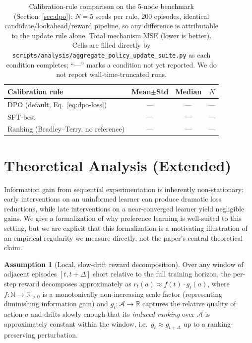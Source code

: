 \documentclass[twoside]{article}
\theoremstyle{plain}
\theoremstyle{definition}
\newtheorem{assumption}[theorem]{Assumption}
\theoremstyle{remark}
\begin{document}
\begin{table}[h]
\centering
\caption{Calibration-rule comparison on the 5-node benchmark (Section~\ref{sec:dpo}): $N{=}5$ seeds per rule, 200 episodes, identical candidate/lookahead/reward pipeline, so any difference is attributable to the update rule alone. Total mechanism MSE (lower is better). Cells are filled directly by \texttt{scripts/analysis/aggregate\_policy\_update\_suite.py} as each condition completes; ``---'' marks a condition not yet reported. We do not report wall-time-truncated runs.}
\label{tab:calibration-rules}
\small
\begin{tabular}{@{}lccc@{}}
\toprule
Calibration rule & Mean$\pm$Std & Median & $N$ \\
\midrule
DPO (default, Eq.~\ref{eq:dpo-loss}) & --- & --- & --- \\
SFT-best & --- & --- & --- \\
Ranking (Bradley--Terry, no reference) & --- & --- & --- \\
\bottomrule
\end{tabular}
\end{table}

\section{Theoretical Analysis (Extended)}
\label{app:theory-extended}

Information gain from sequential experimentation is inherently non-stationary: early interventions on an uninformed learner can produce dramatic loss reductions, while late interventions on a near-converged learner yield negligible gains. We give a formalization of why preference learning is well-suited to this setting, but we are explicit that this formalization is a motivating illustration of an empirical regularity we measure directly, not the paper's central theoretical claim.

\begin{assumption}[Local, slow-drift reward decomposition]
\label{ass:diminish}
Over any window of adjacent episodes $[t, t+\Delta]$ short relative to the full training horizon, the per-step reward decomposes approximately as $r_t(a) \approx f(t) \cdot g_t(a)$, where $f: \mathbb{N} \to \mathbb{R}_{>0}$ is a monotonically non-increasing scale factor (representing diminishing information gain) and $g_t: \mathcal{A} \to \mathbb{R}$ captures the relative quality of action $a$ and drifts slowly enough that its \emph{induced ranking} over $\mathcal{A}$ is approximately constant within the window, i.e.\ $g_t \approx g_{t+\Delta}$ up to a ranking-preserving perturbation.
\end{assumption}
\end{document}
